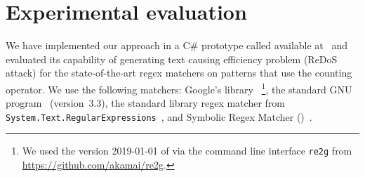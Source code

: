 \documentclass[acmsmall,screen]{acmart}
\newif\ifTR
\begin{document}
%
%

\section{Experimental evaluation}\label{sec:experiments}
\vspace{-0.5mm}

We have implemented our approach in a C\#
prototype called \catool
available at~
and evaluated its capability of generating text causing efficiency problem (ReDoS attack)
for the state-of-the-art regex matchers on patterns that use the counting operator.
We use the following matchers:
Google's \retwo library~\cite{re2}%
\footnote{%
  We used the version 2019-01-01 of \retwo via the command line interface \texttt{re2g} from
  \url{https://github.com/akamai/re2g}.
}, 
%
the standard GNU \grep program~\cite{grep} (version~3.3),
%
the \dotnet standard library regex matcher from
\texttt{System.Text.RegularExpressions}~\cite{dotnet}, 
%
and Symbolic Regex Matcher (\srm)~\cite{VSXW19}.
\end{document}

